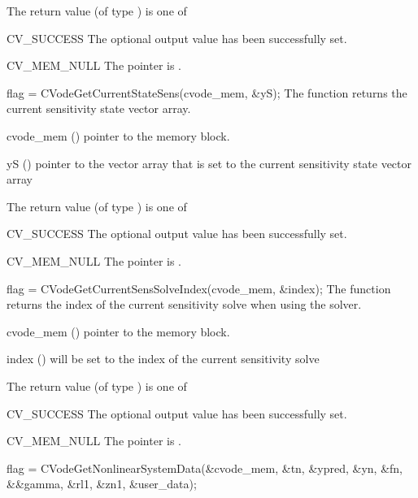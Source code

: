 {
  The return value  (of type ) is one of
  \begin{args}
  \item[CV\_SUCCESS]
    The optional output value has been successfully set.
  \item[CV\_MEM\_NULL]
    The  pointer is .
  \end{args}
}
{}
{
  flag = CVodeGetCurrentStateSens(cvode\_mem, \&yS);
}
{
  The function  returns the current sensitivity
  state vector array.
}
{
  \begin{args}
  \item[cvode\_mem] ()
    pointer to the {\cvodes} memory block.
  \item[yS] ()
    pointer to the vector array that is set to the current sensitivity state
    vector array
  \end{args}
}
{
  The return value  (of type ) is one of
  \begin{args}
  \item[CV\_SUCCESS]
    The optional output value has been successfully set.
  \item[CV\_MEM\_NULL]
    The  pointer is .
  \end{args}
}
{}
{
  flag = CVodeGetCurrentSensSolveIndex(cvode\_mem, \&index);
}
{
  The function  returns the index of the
  current sensitivity solve when using the  solver.
}
{
  \begin{args}
  \item[cvode\_mem] ()
    pointer to the {\cvodes} memory block.
  \item[index] ()
    will be set to the index of the current sensitivity solve
  \end{args}
}
{
  The return value  (of type ) is one of
  \begin{args}
  \item[CV\_SUCCESS]
    The optional output value has been successfully set.
  \item[CV\_MEM\_NULL]
    The  pointer is .
  \end{args}
}
{}
{
  flag = CVodeGetNonlinearSystemData(&cvode\_mem, \&tn, \&ypred, \&yn, \&fn,\\
                                     &\&gamma, \&rl1, \&zn1, \&user\_data);
}
